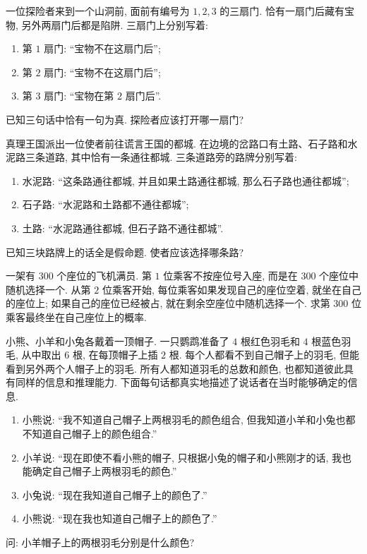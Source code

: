 \documentclass[usesamecnt, thmcnt=section, lang=cn, newtx, 10pt, scheme=chinese]{elegantbook}
\begin{document}
\begin{exercise}
\label{ex:basic-logic-06}
一位探险者来到一个山洞前, 面前有编号为 $1,2,3$ 的三扇门. 恰有一扇门后藏有宝物, 另外两扇门后都是陷阱. 三扇门上分别写着:
\begin{enumerate}[label=\rm(\arabic*)]
  \item 第 $1$ 扇门: ``宝物不在这扇门后'';
  \item 第 $2$ 扇门: ``宝物不在这扇门后'';
  \item 第 $3$ 扇门: ``宝物在第 $2$ 扇门后''.
\end{enumerate}
已知三句话中恰有一句为真. 探险者应该打开哪一扇门?
\end{exercise}

\begin{exercise}
\label{ex:basic-logic-07}
真理王国派出一位使者前往谎言王国的都城. 在边境的岔路口有土路、石子路和水泥路三条道路, 其中恰有一条通往都城. 三条道路旁的路牌分别写着:
\begin{enumerate}[label=\rm(\arabic*)]
  \item 水泥路: ``这条路通往都城, 并且如果土路通往都城, 那么石子路也通往都城'';
  \item 石子路: ``水泥路和土路都不通往都城'';
  \item 土路: ``水泥路通往都城, 但石子路不通往都城''.
\end{enumerate}
已知三块路牌上的话全是假命题. 使者应该选择哪条路?
\end{exercise}

\begin{exercise}
\label{ex:basic-logic-16}
一架有 $300$ 个座位的飞机满员. 第 $1$ 位乘客不按座位号入座, 而是在 $300$ 个座位中随机选择一个. 从第 $2$ 位乘客开始, 每位乘客如果发现自己的座位空着, 就坐在自己的座位上; 如果自己的座位已经被占, 就在剩余空座位中随机选择一个. 求第 $300$ 位乘客最终坐在自己座位上的概率.
\end{exercise}

\begin{exercise}
\label{ex:basic-logic-17}
小熊、小羊和小兔各戴着一顶帽子. 一只鹦鹉准备了 $4$ 根红色羽毛和 $4$ 根蓝色羽毛, 从中取出 $6$ 根, 在每顶帽子上插 $2$ 根. 每个人都看不到自己帽子上的羽毛, 但能看到另外两个人帽子上的羽毛. 所有人都知道羽毛的总数和颜色, 也都知道彼此具有同样的信息和推理能力. 下面每句话都真实地描述了说话者在当时能够确定的信息.
\begin{enumerate}[label=\rm(\arabic*)]
  \item 小熊说: ``我不知道自己帽子上两根羽毛的颜色组合, 但我知道小羊和小兔也都不知道自己帽子上的颜色组合.''
  \item 小羊说: ``现在即使不看小熊的帽子, 只根据小兔的帽子和小熊刚才的话, 我也能确定自己帽子上两根羽毛的颜色.''
  \item 小兔说: ``现在我知道自己帽子上的颜色了.''
  \item 小熊说: ``现在我也知道自己帽子上的颜色了.''
\end{enumerate}
问: 小羊帽子上的两根羽毛分别是什么颜色?
\end{exercise}
\end{document}
